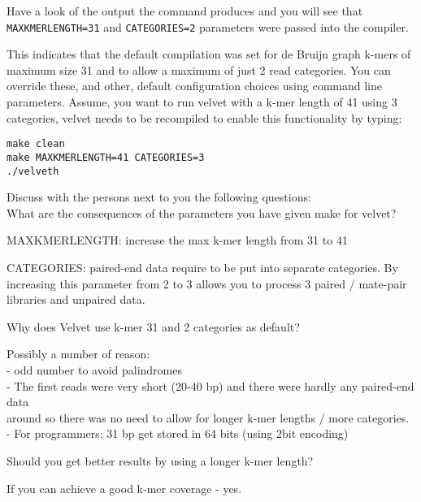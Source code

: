 \begin{steps}
Have a look of the output the command produces and you will see that
\texttt{MAXKMERLENGTH=31} and \texttt{CATEGORIES=2} parameters were passed into
the compiler.

This indicates that the default compilation was set for de Bruijn graph k-mers of
maximum size 31 and to allow a maximum of just 2 read categories. You can
override these, and other, default configuration choices using command line
parameters. Assume, you want to run velvet with a k-mer length of 41 using 3
categories, velvet needs to be recompiled to enable this functionality by
typing:
\begin{lstlisting}
make clean
make MAXKMERLENGTH=41 CATEGORIES=3
./velveth
\end{lstlisting}
\end{steps}

\begin{questions}
Discuss with the persons next to you the following questions:\\
What are the consequences of the parameters you have given make for velvet?
\begin{answer}
MAXKMERLENGTH: increase the max k-mer length from 31 to 41

CATEGORIES: paired-end data require to be put into separate categories. By
increasing this parameter from 2 to 3 allows you to process 3 paired / mate-pair
libraries and unpaired data.
\end{answer}

Why does Velvet use k-mer 31 and 2 categories as default?
\begin{answer}
Possibly a number of reason:\\
  - odd number to avoid palindromes\\
  - The first reads were very short (20-40 bp) and there were hardly any paired-end data\\
     around so there was no need to allow for longer k-mer lengths / more categories.\\
  - For programmers: 31 bp get stored in 64 bits (using 2bit encoding)
\end{answer}

Should you get better results by using a longer k-mer length?
\begin{answer}
If you can achieve a good k-mer coverage - yes.
\end{answer}
\end{questions}

